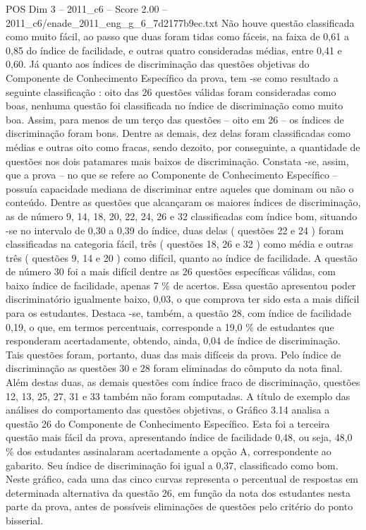 \begin{textsample}{POS Dim 3 – 2011\_c6 – Score 2.00 – 2011\_c6/enade\_2011\_eng\_g\_6\_7d2177b9ec.txt}
Não houve questão classificada como muito fácil, ao passo que duas foram tidas como fáceis, na faixa de 0,61 a 0,85 do índice de facilidade, e outras quatro consideradas médias, entre 0,41 e 0,60.
Já quanto aos índices de discriminação das questões objetivas do Componente de Conhecimento Específico da prova, tem -se como resultado a seguinte classificação : oito das 26 questões válidas foram consideradas como boas, nenhuma questão foi classificada no índice de discriminação como muito boa.
Assim, para menos de um terço das questões – oito em 26 – os índices de discriminação foram bons.
Dentre as demais, dez delas foram classificadas como médias e outras oito como fracas, sendo dezoito, por conseguinte, a quantidade de questões nos dois patamares mais baixos de discriminação.
Constata -se, assim, que a prova – no que se refere ao Componente de Conhecimento Específico – possuía capacidade mediana de discriminar entre aqueles que dominam ou não o conteúdo.
Dentre as questões que alcançaram os maiores índices de discriminação, as de número 9, 14, 18, 20, 22, 24, 26 e 32 classificadas com índice bom, situando -se no intervalo de 0,30 a 0,39 do índice, duas delas ( questões 22 e 24 ) foram classificadas na categoria fácil, três ( questões 18, 26 e 32 ) como média e outras três ( questões 9, 14 e 20 ) como difícil, quanto ao índice de facilidade.
A questão de número 30 foi a mais difícil dentre as 26 questões específicas válidas, com baixo índice de facilidade, apenas 7 \% de acertos.
Essa questão apresentou poder discriminatório igualmente baixo, 0,03, o que comprova ter sido esta a mais difícil para os estudantes.
Destaca -se, também, a questão 28, com índice de facilidade 0,19, o que, em termos percentuais, corresponde a 19,0 \% de estudantes que responderam acertadamente, obtendo, ainda, 0,04 de índice de discriminação.
Tais questões foram, portanto, duas das mais difíceis da prova.
Pelo índice de discriminação as questões 30 e 28 foram eliminadas do cômputo da nota final.
Além destas duas, as demais questões com índice fraco de discriminação, questões 12, 13, 25, 27, 31 e 33 também não foram computadas.
A título de exemplo das análises do comportamento das questões objetivas, o Gráfico 3.14 analisa a questão 26 do Componente de Conhecimento Específico.
Esta foi a terceira questão mais fácil da prova, apresentando índice de facilidade 0,48, ou seja, 48,0 \% dos estudantes assinalaram acertadamente a opção A, correspondente ao gabarito.
Seu índice de discriminação foi igual a 0,37, classificado como bom.
Neste gráfico, cada uma das cinco curvas representa o percentual de respostas em determinada alternativa da questão 26, em função da nota dos estudantes nesta parte da prova, antes de possíveis eliminações de questões pelo critério do ponto bisserial.

\end{textsample}

